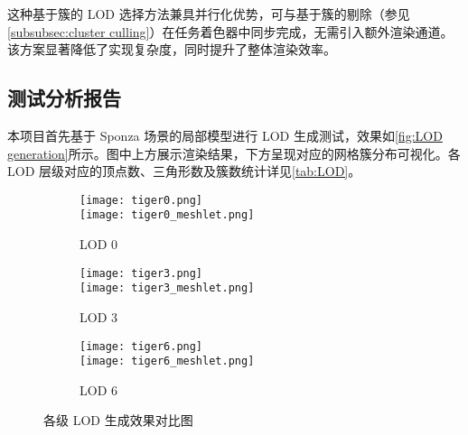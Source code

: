 这种基于簇的 LOD 选择方法兼具并行化优势，可与基于簇的剔除（参见\ref{subsubsec:cluster culling}）在任务着色器中同步完成，无需引入额外渲染通道。该方案显著降低了实现复杂度，同时提升了整体渲染效率。

\subsection{测试分析报告}

本项目首先基于 Sponza 场景的局部模型进行 LOD 生成测试，效果如\autoref{fig:LOD generation}所示。图中上方展示渲染结果，下方呈现对应的网格簇分布可视化。各 LOD 层级对应的顶点数、三角形数及簇数统计详见\autoref{tab:LOD}。


\begin{figure*}[h]
    \centering
    \begin{subfigure}[t]{0.32\linewidth}
        \centering
        \texttt{[image: tiger0.png]}\\
        \vspace{0.1cm}
        \texttt{[image: tiger0\_meshlet.png]}
        \caption{LOD 0}
    \end{subfigure}%
    \hfill
    \begin{subfigure}[t]{0.32\linewidth}
        \centering
        \texttt{[image: tiger3.png]}\\
        \vspace{0.1cm}
        \texttt{[image: tiger3\_meshlet.png]}
        \caption{LOD 3}
    \end{subfigure}%
    \hfill
    \begin{subfigure}[t]{0.32\linewidth}
        \centering
        \texttt{[image: tiger6.png]}\\
        \vspace{0.1cm}
        \texttt{[image: tiger6\_meshlet.png]}
        \caption{LOD 6}
    \end{subfigure}
    \caption{各级 LOD 生成效果对比图}
    \label{fig:LOD generation}
\end{figure*}

